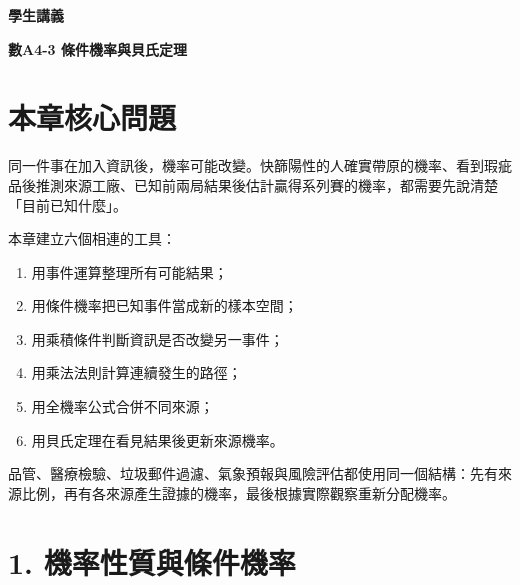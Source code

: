 \documentclass[11pt,a4paper]{article}
\providecommand{\tightlist}{%
  \setlength{\itemsep}{0pt}\setlength{\parskip}{0pt}}
\begin{document}
\begin{tcolorbox}[
  enhanced,colback=white,colframe=HandoutBlue,boxrule=1.1pt,arc=2mm,
  borderline west={3pt}{0pt}{HandoutBlue},left=5mm,right=4mm,top=4mm,bottom=4mm
]
{\sffamily\small\bfseries\color{HandoutBlue}學生講義}\par
{\sffamily\bfseries\LARGE\color{HandoutInk}數A4-3 條件機率與貝氏定理}\par
\vspace{0.35em}{\large 用已知資訊縮小樣本空間，判斷事件是否獨立，並由新證據更新原先機率}\par
{}\par
{}\par
\end{tcolorbox}


\section{本章核心問題}\label{ux672cux7ae0ux6838ux5fc3ux554fux984c}

同一件事在加入資訊後，機率可能改變。快篩陽性的人確實帶原的機率、看到瑕疵品後推測來源工廠、已知前兩局結果後估計贏得系列賽的機率，都需要先說清楚「目前已知什麼」。

本章建立六個相連的工具：

\begin{enumerate}
\def\labelenumi{\arabic{enumi}.}
\tightlist
\item
  用事件運算整理所有可能結果；
\item
  用條件機率把已知事件當成新的樣本空間；
\item
  用乘積條件判斷資訊是否改變另一事件；
\item
  用乘法法則計算連續發生的路徑；
\item
  用全機率公式合併不同來源；
\item
  用貝氏定理在看見結果後更新來源機率。
\end{enumerate}

品管、醫療檢驗、垃圾郵件過濾、氣象預報與風險評估都使用同一個結構：先有來源比例，再有各來源產生證據的機率，最後根據實際觀察重新分配機率。

\section{1. 機率性質與條件機率}\label{ux6a5fux7387ux6027ux8ceaux8207ux689dux4ef6ux6a5fux7387}
\end{document}
